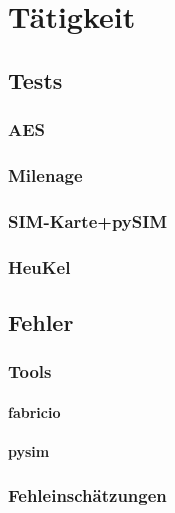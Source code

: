 \section{Tätigkeit} %
	\subsection{Tests}
		\subsubsection{AES}
		\subsubsection{Milenage}
		\subsubsection{SIM-Karte+pySIM}
		\subsubsection{HeuKel}
	\subsection{Fehler}
		\subsubsection{Tools}
			\paragraph{fabricio}
			\paragraph{pysim}
		\subsubsection{Fehleinschätzungen}
\clearpage